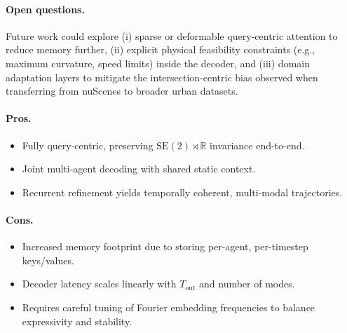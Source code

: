 \paragraph{Open questions.}
Future work could explore (i) sparse or deformable query-centric attention to reduce memory further, (ii) explicit physical feasibility constraints (e.g., maximum curvature, speed limits) inside the decoder, and (iii) domain adaptation layers to mitigate the intersection-centric bias observed when transferring from nuScenes to broader urban datasets\cite{lmformerYadav2025}.


\paragraph{Pros.}
\begin{itemize}[leftmargin=*, label=\greenoplus]
  \item Fully query-centric, preserving \(\mathrm{SE}(2)\!\rtimes\!\mathbb{R}\) invariance end-to-end.
  \item Joint multi-agent decoding with shared static context.
  \item Recurrent refinement yields temporally coherent, multi-modal trajectories.
\end{itemize}

\paragraph{Cons.}
\begin{itemize}[leftmargin=*, label=\redominus]
  \item Increased memory footprint due to storing per-agent, per-timestep keys/values.
  \item Decoder latency scales linearly with \(T_{\text{out}}\) and number of modes.
  \item Requires careful tuning of Fourier embedding frequencies to balance expressivity and stability.
\end{itemize}

\newpage